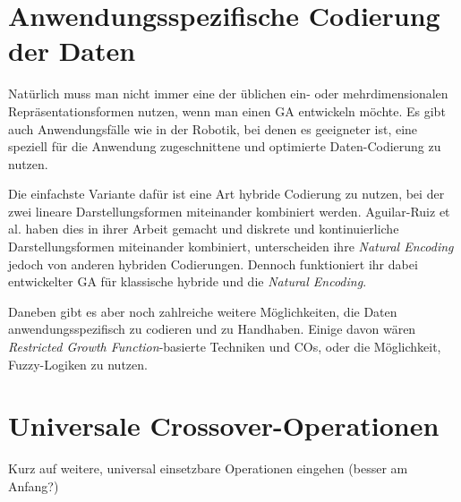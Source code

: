 \section{Anwendungsspezifische Codierung der Daten}
\label{sec:AnwSpezCod}

	Natürlich muss man nicht immer eine der üblichen ein- oder mehrdimensionalen Repräsentationsformen nutzen, wenn man einen GA entwickeln möchte. Es gibt auch Anwendungsfälle wie \zB in der Robotik, \cite{GABook} bei denen es geeigneter ist, eine speziell für die Anwendung zugeschnittene und optimierte Daten-Codierung zu nutzen.
	
	Die einfachste Variante dafür ist eine Art hybride Codierung zu nutzen, bei der zwei lineare Darstellungsformen miteinander kombiniert werden. Aguilar-Ruiz et al. haben dies in ihrer Arbeit \cite{NaturalCoding} gemacht und diskrete und kontinuierliche Darstellungsformen miteinander kombiniert, unterscheiden ihre \textit{Natural Encoding} jedoch von anderen hybriden Codierungen. Dennoch funktioniert ihr dabei entwickelter GA für klassische hybride und die \textit{Natural Encoding}.
	
	Daneben gibt es aber noch zahlreiche weitere Möglichkeiten, die Daten anwendungsspezifisch zu codieren und zu Handhaben. Einige davon wären \zB \textit{Restricted Growth Function}-basierte Techniken und COs, \cite{RestrictedGrowthFunction} oder die Mög\-lich\-keit, Fuzzy-Logiken zu nutzen. \cite{FuzzyEncoding}

\section{Universale Crossover-Operationen}
\label{sec:UnivOp}

	Kurz auf weitere, universal einsetzbare Operationen eingehen (besser am Anfang?)